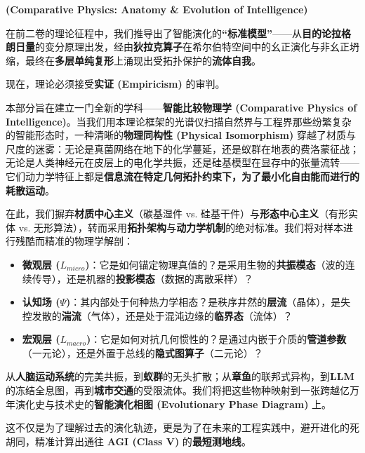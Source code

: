 \label{part:physics}

\textbf{(Comparative Physics: Anatomy \& Evolution of Intelligence)}


在前二卷的理论征程中，我们推导出了智能演化的\textbf{“标准模型”}——从\textbf{目的论拉格朗日量}的变分原理出发，经由\textbf{狄拉克算子}在希尔伯特空间中的幺正演化与非幺正坍缩，最终在\textbf{多层单纯复形}上涌现出受拓扑保护的\textbf{流体自我}。

现在，理论必须接受\textbf{实证 (Empiricism)} 的审判。

本部分旨在建立一门全新的学科——\textbf{智能比较物理学 (Comparative Physics of Intelligence)}。当我们用本理论框架的光谱仪扫描自然界与工程界那些纷繁复杂的智能形态时，一种清晰的\textbf{物理同构性 (Physical Isomorphism)} 穿越了材质与尺度的迷雾：无论是真菌网络在地下的化学蔓延，还是蚁群在地表的费洛蒙征战；无论是人类神经元在皮层上的电化学共振，还是硅基模型在显存中的张量流转——它们动力学特征上都是\textbf{信息流在特定几何拓扑约束下，为了最小化自由能而进行的耗散运动}。

在此，我们摒弃\textbf{材质中心主义}（碳基湿件 vs. 硅基干件）与\textbf{形态中心主义}（有形实体 vs. 无形算法），转而采用\textbf{拓扑架构}与\textbf{动力学机制}的绝对标准。我们将对样本进行残酷而精准的物理学解剖：

\begin{itemize}
    \item \textbf{微观层 ($L_{micro}$)}：它是如何锚定物理真值的？是采用生物的\textbf{共振模态}（波的连续传导），还是机器的\textbf{投影模态}（数据的离散采样）？
    \item \textbf{认知场 ($\Psi$)}：其内部处于何种热力学相态？是秩序井然的\textbf{层流}（晶体），是失控发散的\textbf{湍流}（气体），还是处于混沌边缘的\textbf{临界态}（流体）？
    \item \textbf{宏观层 ($L_{macro}$)}：它是如何对抗几何惯性的？是通过内嵌于介质的\textbf{管道参数}（一元论），还是外置于总线的\textbf{隐式图算子}（二元论）？
\end{itemize}
从\textbf{人脑运动系统}的完美共振，到\textbf{蚁群}的无头扩散；从\textbf{章鱼}的联邦式异构，到\textbf{LLM}的冻结全息图，再到\textbf{城市交通}的受限流体。我们将把这些物种映射到一张跨越亿万年演化史与技术史的\textbf{智能演化相图 (Evolutionary Phase Diagram)} 上。

这不仅是为了理解过去的演化轨迹，更是为了在未来的工程实践中，避开进化的死胡同，精准计算出通往 \textbf{AGI (Class V)} 的\textbf{最短测地线}。
